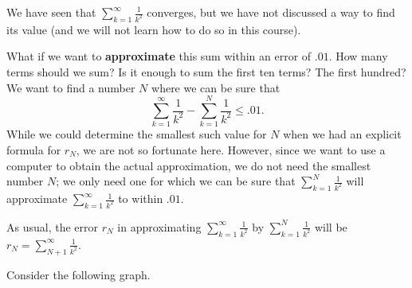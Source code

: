 \documentclass{ximera}
\begin{document}
\begin{model}
We have seen that  $\sum_{k=1}^\infty \frac{1}{k^2}$ converges, but we have not discussed a way to find its value (and
we will not learn how to do so in this course). 

What if we want to \textbf{approximate} this sum within an error of
$.01$.  How many terms should we sum?  Is it enough to sum
the first ten terms?  The first hundred?  We want to find a number $N$
where we can be sure that
\[
\sum_{k=1}^\infty \frac{1}{k^2}-\sum_{k=1}^N \frac{1}{k^2} \leq .01.
\]
While we could determine the smallest such value for $N$ when we had an explicit formula for $r_N$, we are not so fortunate here.  However, since we want to use a computer to obtain the actual approximation, we do not need the smallest number $N$; we only need one for which we can be sure that $\sum_{k=1}^N \frac{1}{k^2}$ will approximate $\sum_{k=1}^\infty \frac{1}{k^2}$ to within $.01$.  

As usual, the error $r_N$ in approximating $\sum_{k=1}^\infty \frac{1}{k^2}$ by $\sum_{k=1}^N \frac{1}{k^2}$ will be $r_N= \sum_{N+1}^\infty \frac{1}{k^2}$.

Consider the following graph.

\begin{image}
\end{image}
\end{model}
\end{document}
